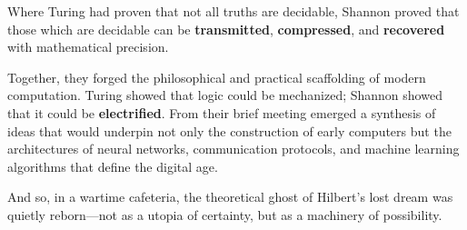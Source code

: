Where Turing had proven that not all truths are decidable, Shannon proved that those which are decidable can be \textbf{transmitted}, \textbf{compressed}, and \textbf{recovered} with mathematical precision.

Together, they forged the philosophical and practical scaffolding of modern computation. Turing showed that logic could be mechanized; Shannon showed that it could be \textbf{electrified}. From their brief meeting emerged a synthesis of ideas that would underpin not only the construction of early computers but the architectures of neural networks, communication protocols, and machine learning algorithms that define the digital age.

And so, in a wartime cafeteria, the theoretical ghost of Hilbert’s lost dream was quietly reborn---not as a utopia of certainty, but as a machinery of possibility.
